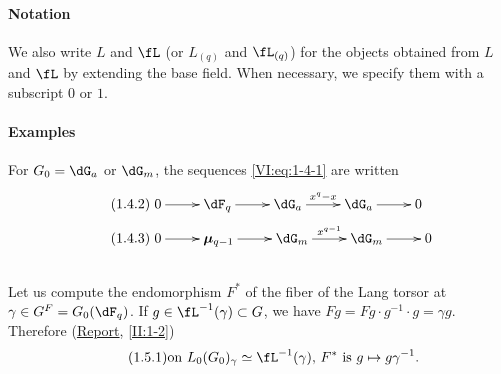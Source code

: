 \documentclass[oneside]{book}
\newcommand{\dmu}{{\bm\mu}}
\theoremstyle{sga-source}
\theoremstyle{sga-source-dash}
\theoremstyle{sga-source-dotdash}
\theoremstyle{sga-source-number-note-dash}
\theoremstyle{sga-source-note-number-dotdash}
\theoremstyle{sga-source-example-dotdash}
\theoremstyle{sga-source-inline-number}
\theoremstyle{sga-source-bare-number}
\theoremstyle{sga-source}
\newcommand{\PrintPage}[1]{}\newcommand{\MathPage}[1]{}\newcommand{\PrintCite}[2]{#1}\newcommand{\var}[3]{#2}
\begin{document}
\paragraph{Notation}
We also write $L$ and $\fL$ (or $L_{(q)}$ and $\fL_{(q)}$) for the objects obtained 
from $L$ and $\fL$ by extending the base field. When necessary, we 
specify them with a subscript $0$ or $1$.


\PrintPage{172}
\paragraph{Examples}
For $G_0=\dG_a$ or $\dG_m$, the sequences \eqref{VI:eq:1-4-1} are written 
\begin{align*}\tag{1.4.2}\label{VI:eq:1-4-2}
&\xymatrix{
  0 \ar[r] 
    & \dF_q \ar[r] 
    & \dG_a \ar[r]^-{x^q-x} 
    & \dG_a \ar[r] 
    & 0 
} \\
\tag{1.4.3}\label{VI:eq:1-4-3}
&\xymatrix{
  0 \ar[r] 
    & \dmu_{q-1} \ar[r] 
    & \dG_m \ar[r]^-{x^{q-1}} 
    & \dG_m \ar[r] 
    & 0
}
\end{align*}





\subsection{}\label{VI:1-5}

Let us compute the endomorphism $F^\ast$ of the fiber of the Lang torsor at 
$\gamma\in G^F=G_0(\dF_q)$. If $g\in \fL^{-1}(\gamma)\subset G$, we have 
$F g = F g\cdot g^{-1}\cdot g = \gamma g$. Therefore (\hyperref[II]{Report}, 
\ref{II:1-2}) 
\begin{equation*}\tag{1.5.1}\label{VI:eq:1-5-1}
  \text{on $L_0(G_0)_\gamma\simeq \fL^{-1}(\gamma)$, $F^\ast$ is $g\mapsto g\gamma^{-1}$.}
\end{equation*}





\subsection{}\label{VI:1-6}
\end{document}
